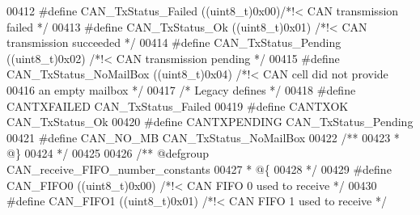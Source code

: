 \begin{DoxyCode}
00412 \textcolor{preprocessor}{#}\textcolor{preprocessor}{define} \textcolor{preprocessor}{CAN\_TxStatus\_Failed}         \textcolor{preprocessor}{(}\textcolor{preprocessor}{(}\textcolor{preprocessor}{uint8\_t}\textcolor{preprocessor}{)}0x00\textcolor{preprocessor}{)}\textcolor{comment}{/*!< CAN transmission failed */}
00413 \textcolor{preprocessor}{#}\textcolor{preprocessor}{define} \textcolor{preprocessor}{CAN\_TxStatus\_Ok}             \textcolor{preprocessor}{(}\textcolor{preprocessor}{(}\textcolor{preprocessor}{uint8\_t}\textcolor{preprocessor}{)}0x01\textcolor{preprocessor}{)} \textcolor{comment}{/*!< CAN transmission succeeded */}
00414 \textcolor{preprocessor}{#}\textcolor{preprocessor}{define} \textcolor{preprocessor}{CAN\_TxStatus\_Pending}        \textcolor{preprocessor}{(}\textcolor{preprocessor}{(}\textcolor{preprocessor}{uint8\_t}\textcolor{preprocessor}{)}0x02\textcolor{preprocessor}{)} \textcolor{comment}{/*!< CAN transmission pending */}
00415 \textcolor{preprocessor}{#}\textcolor{preprocessor}{define} \textcolor{preprocessor}{CAN\_TxStatus\_NoMailBox}      \textcolor{preprocessor}{(}\textcolor{preprocessor}{(}\textcolor{preprocessor}{uint8\_t}\textcolor{preprocessor}{)}0x04\textcolor{preprocessor}{)} \textcolor{comment}{/*!< CAN cell did not provide }
00416 \textcolor{comment}{                                                         an empty mailbox */}
00417 \textcolor{comment}{/* Legacy defines */}
00418 \textcolor{preprocessor}{#}\textcolor{preprocessor}{define} \textcolor{preprocessor}{CANTXFAILED}                  CAN_TxStatus_Failed
00419 \textcolor{preprocessor}{#}\textcolor{preprocessor}{define} \textcolor{preprocessor}{CANTXOK}                      CAN_TxStatus_Ok
00420 \textcolor{preprocessor}{#}\textcolor{preprocessor}{define} \textcolor{preprocessor}{CANTXPENDING}                 CAN_TxStatus_Pending
00421 \textcolor{preprocessor}{#}\textcolor{preprocessor}{define} \textcolor{preprocessor}{CAN\_NO\_MB}                    CAN_TxStatus_NoMailBox
00422 \textcolor{comment}{/**}
00423 \textcolor{comment}{  * @\}}
00424 \textcolor{comment}{  */}
00425 
00426 \textcolor{comment}{/** @defgroup CAN\_receive\_FIFO\_number\_constants }
00427 \textcolor{comment}{  * @\{}
00428 \textcolor{comment}{  */}
00429 \textcolor{preprocessor}{#}\textcolor{preprocessor}{define} \textcolor{preprocessor}{CAN\_FIFO0}                 \textcolor{preprocessor}{(}\textcolor{preprocessor}{(}\textcolor{preprocessor}{uint8\_t}\textcolor{preprocessor}{)}0x00\textcolor{preprocessor}{)} \textcolor{comment}{/*!< CAN FIFO 0 used to receive */}
00430 \textcolor{preprocessor}{#}\textcolor{preprocessor}{define} \textcolor{preprocessor}{CAN\_FIFO1}                 \textcolor{preprocessor}{(}\textcolor{preprocessor}{(}\textcolor{preprocessor}{uint8\_t}\textcolor{preprocessor}{)}0x01\textcolor{preprocessor}{)} \textcolor{comment}{/*!< CAN FIFO 1 used to receive */}

\end{DoxyCode}

